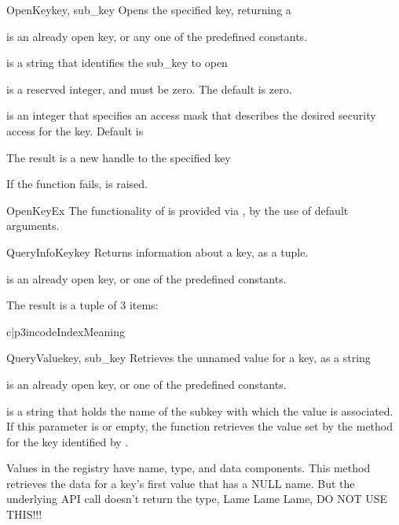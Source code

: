\begin{funcdesc}{OpenKey}{key, sub_key}
  Opens the specified key, returning a 

  is an already open key, or any one of the predefined
  constants.

  is a string that identifies the sub_key to open
 
  is a reserved integer, and must be zero.  The default is zero.
 
  is an integer that specifies an access mask that describes 
 the desired security access for the key.  Default is 
 
 The result is a new handle to the specified key
 
 If the function fails,  is raised.
\end{funcdesc}


\begin{funcdesc}{OpenKeyEx}{}
  The functionality of  is provided via
  , by the use of default arguments.
\end{funcdesc}


\begin{funcdesc}{QueryInfoKey}{key}
 Returns information about a key, as a tuple.

  is an already open key, or one of the predefined 
  constants.

 The result is a tuple of 3 items:

 \begin{tableii}{c|p{3in}}{code}{Index}{Meaning}
 \end{tableii}
\end{funcdesc}


\begin{funcdesc}{QueryValue}{key, sub_key}
 Retrieves the unnamed value for a key, as a string

  is an already open key, or one of the predefined 
  constants.

  is a string that holds the name of the subkey with which 
 the value is associated.  If this parameter is  or empty, the 
 function retrieves the value set by the  method 
 for the key identified by .

 Values in the registry have name, type, and data components. This 
 method retrieves the data for a key's first value that has a NULL name.
 But the underlying API call doesn't return the type, Lame Lame Lame,
 DO NOT USE THIS!!!
\end{funcdesc}


